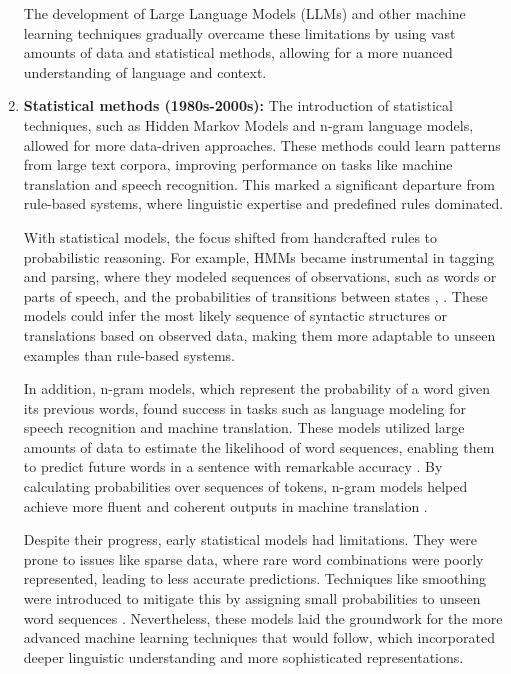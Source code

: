 \begin{enumerate}
The development of Large Language Models (LLMs) and other machine learning techniques gradually overcame these limitations by using vast amounts of data and statistical methods, allowing for a more nuanced understanding of language and context.

    \item \textbf{Statistical methods (1980s-2000s):} The introduction of statistical techniques, such as Hidden Markov Models and n-gram language models, allowed for more data-driven approaches. These methods could learn patterns from large text corpora, improving performance on tasks like machine translation and speech recognition. This marked a significant departure from rule-based systems, where linguistic expertise and predefined rules dominated.

With statistical models, the focus shifted from handcrafted rules to probabilistic reasoning. For example, HMMs became instrumental in tagging and parsing, where they modeled sequences of observations, such as words or parts of speech, and the probabilities of transitions between states \cite{koehn2009statistical}, \cite{charniak1997statistical}. These models could infer the most likely sequence of syntactic structures or translations based on observed data, making them more adaptable to unseen examples than rule-based systems.

In addition, n-gram models, which represent the probability of a word given its previous words, found success in tasks such as language modeling for speech recognition and machine translation. These models utilized large amounts of data to estimate the likelihood of word sequences, enabling them to predict future words in a sentence with remarkable accuracy \cite{koehn2009statistical}. By calculating probabilities over sequences of tokens, n-gram models helped achieve more fluent and coherent outputs in machine translation \cite{charniak1997statistical}.

Despite their progress, early statistical models had limitations. They were prone to issues like sparse data, where rare word combinations were poorly represented, leading to less accurate predictions. Techniques like smoothing were introduced to mitigate this by assigning small probabilities to unseen word sequences \cite{charniak1997statistical}. Nevertheless, these models laid the groundwork for the more advanced machine learning techniques that would follow, which incorporated deeper linguistic understanding and more sophisticated representations.
    

\end{enumerate}
